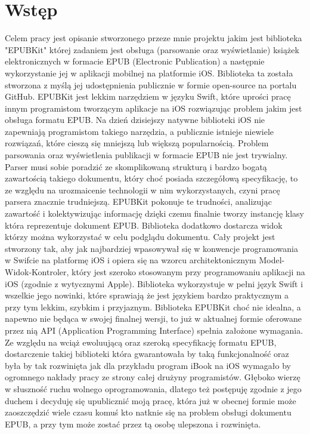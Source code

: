 \chapter{Wstęp}

Celem pracy jest opisanie stworzonego przeze mnie projektu jakim jest biblioteka "EPUBKit" której zadaniem jest obsługa (parsowanie oraz wyświetlanie) książek elektronicznych w formacie EPUB (Electronic Publication) a następnie wykorzystanie jej w aplikacji mobilnej na platformie iOS. Biblioteka ta została stworzona z myślą jej udostępnienia publicznie w formie open-source na portalu GitHub. EPUBKit jest lekkim narzędziem w języku Swift, które uprości pracę innym programistom tworzącym aplikacje na iOS rozwiązując problem jakim jest obsługa formatu EPUB. Na dzień dzisiejszy natywne biblioteki iOS nie zapewniają programistom takiego narzędzia, a publicznie istnieje niewiele rozwiązań, które cieszą się mniejszą lub większą popularnością. Problem parsowania oraz wyświetlenia publikacji w formacie EPUB nie jest trywialny. Parser musi sobie poradzić ze skomplikowaną strukturą i bardzo bogatą zawartością takiego dokumentu, który choć posiada szczegółową specyfikację, to ze względu na urozmaicenie technologii w nim wykorzystanych, czyni pracę parsera znacznie trudniejszą. EPUBKit pokonuje te trudności, analizując zawartość i kolektywizując informację dzięki czemu finalnie tworzy instancję klasy która reprezentuje dokument EPUB. Biblioteka dodatkowo dostarcza widok którzy można wykorzystać w celu podglądu dokumentu. Cały projekt jest stworzony tak, aby jak najbardziej wpasowywał się w konwencje programowania w Swifcie na platformę iOS i opiera się na wzorcu architektonicznym Model-Widok-Kontroler, który jest szeroko stosowanym przy programowaniu aplikacji na iOS (zgodnie z wytycznymi Apple). Biblioteka wykorzystuje w pełni język Swift i wszelkie jego nowinki, które sprawiają że jest językiem bardzo praktycznym a przy tym lekkim, szybkim i przyjaznym. Biblioteka EPUBKit choć nie idealna, a napewno nie będąca w swojej finalnej wersji, to już w aktualnej formie oferowane przez nią API (Application Programming Interface) spełnia założone wymagania. Ze względu na wciąż ewoluującą oraz szeroką specyfikację formatu EPUB, dostarczenie takiej biblioteki która gwarantowała by taką funkcjonalność oraz była by tak rozwinięta jak dla przykładu program iBook na iOS wymagało by ogromnego nakłady pracy ze strony całej drużyny programistów. Głęboko wierzę w słuszność ruchu wolnego oprogramowania, dlatego też postępuję zgodnie z jego duchem i decyduję się upublicznić moją pracę, która już w obecnej formie może zaoszczędzić wiele czasu komuś kto natknie się na problem obsługi dokumentu EPUB, a przy tym może zostać przez tą osobę ulepszona i rozwinięta.

